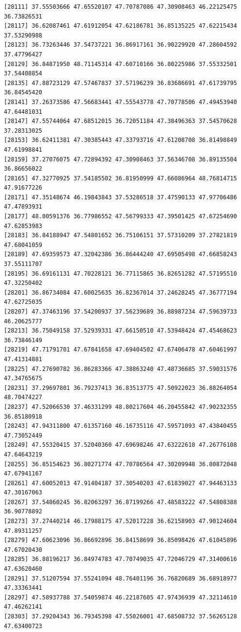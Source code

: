 \documentclass[
  letterpaper,
  DIV=11,
  numbers=noendperiod]{scrartcl}
\begin{document}
\begin{verbatim}
[28111] 37.55503666 47.65520107 47.70787086 47.30908463 46.22125475 36.73826531
[28117] 36.62087461 47.61912054 47.62186781 36.85135225 47.62215434 37.53290988
[28123] 36.73263446 37.54737221 36.86917161 36.90229920 47.28604592 37.47796427
[28129] 36.84871950 48.71145314 47.60710166 36.80225986 37.55332501 37.54408854
[28135] 47.88723129 47.57467837 37.57196239 36.83686691 47.61739795 36.84545420
[28141] 37.26373586 47.56683441 47.55543778 47.70778506 47.49453940 47.64481031
[28147] 47.55744064 47.68512015 36.72051184 47.38496363 37.54570628 37.28313025
[28153] 36.62411381 47.30385443 47.33793716 47.61208708 36.81498849 47.61998841
[28159] 37.27076075 47.72894392 47.30908463 37.56346708 36.89135504 36.86656022
[28165] 47.32770925 37.54185502 36.81950999 47.66086964 48.76814715 47.91677226
[28171] 47.35148674 46.19843843 37.53286518 37.47590133 47.97706486 47.47893931
[28177] 48.00591376 36.77986552 47.56799333 47.39501425 47.67254690 47.62853983
[28183] 36.84188947 47.54801652 36.75106151 37.57310209 37.27821819 47.68041059
[28189] 47.69359573 47.32042386 36.86444240 47.69505498 47.66858243 37.55111707
[28195] 36.69161131 47.70228121 36.77115865 36.82651282 47.57195510 47.32250402
[28201] 36.86734084 47.60025635 36.82367014 37.24628245 47.36777194 47.62725035
[28207] 47.37463196 37.54200937 37.56239689 36.88987234 47.59639733 46.20625777
[28213] 36.75049158 37.52939331 47.66150510 47.53948424 47.45468623 36.73846149
[28219] 47.71791701 47.67841658 47.69404502 47.67406478 47.60461997 47.41314881
[28225] 47.27690782 36.86283366 47.38863240 47.48736685 37.59031576 47.34765675
[28231] 37.29697801 36.79237413 36.83513775 47.50922023 36.88264054 48.70474227
[28237] 47.52066530 37.46331299 48.80217604 46.20455842 47.90232355 36.85180918
[28243] 47.94311800 47.61357160 46.16735116 47.59571093 47.43840455 47.73052449
[28249] 47.55320415 37.52040360 47.69698246 47.63222610 47.26776108 47.64643219
[28255] 36.85154623 36.80271774 47.70786564 47.30209948 36.80872048 47.67941167
[28261] 47.60052013 47.91404187 37.30540203 47.61839027 47.94463133 47.30167063
[28267] 37.54860245 36.82063297 36.87199266 47.48583222 47.54808388 36.90778892
[28273] 37.27440214 46.17988175 47.52017228 36.62158903 47.90124604 47.89311257
[28279] 47.60623096 36.86692896 36.84158699 36.85098426 47.61045896 47.67020430
[28285] 36.88196217 36.84974783 47.70749035 47.72046729 47.31400616 47.63620460
[28291] 37.51207594 37.55241094 48.76401196 36.76820689 36.68918977 47.33363441
[28297] 47.58937788 37.54059874 46.22187605 47.97436939 47.32114610 47.46262141
[28303] 37.29204343 36.79345398 47.55026001 47.68508732 37.56265128 47.63400723

\end{verbatim}
\end{document}
